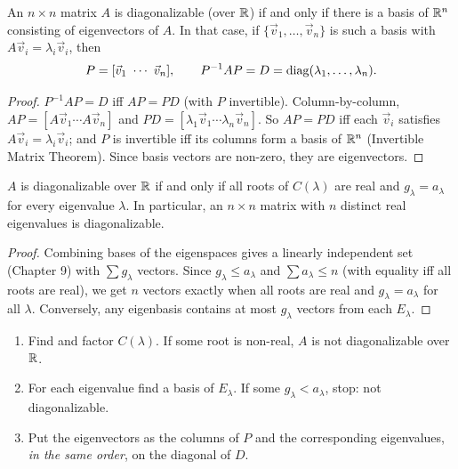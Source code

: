 \begin{theorem}
An $n\times n$ matrix $A$ is diagonalizable (over $\mathbb{R}$) if and only if there is a basis of $\mathbb{R}^n$ consisting
of eigenvectors of $A$. In that case, if $\{\vec v_1,\dots,\vec v_n\}$ is such a basis with
$A\vec v_i=\lambda_i\vec v_i$, then
\[
  P=[\vec v_1\ \cdots\ \vec v_n],\qquad P^{-1}AP=D=\operatorname{diag}(\lambda_1,\dots,\lambda_n).
\]
\end{theorem}
\begin{proof}
$P^{-1}AP=D$ iff $AP=PD$ (with $P$ invertible). Column-by-column, $AP=[A\vec v_1\cdots A\vec v_n]$ and
$PD=[\lambda_1\vec v_1\cdots\lambda_n\vec v_n]$. So $AP=PD$ iff each $\vec v_i$ satisfies
$A\vec v_i=\lambda_i\vec v_i$; and $P$ is invertible iff its columns form a basis of $\mathbb{R}^n$ (Invertible Matrix
Theorem). Since basis vectors are non-zero, they are eigenvectors.
\end{proof}

\begin{theorem}
$A$ is diagonalizable over $\mathbb{R}$ if and only if all roots of $C(\lambda)$ are real and $g_\lambda=a_\lambda$ for
every eigenvalue $\lambda$. In particular, an $n\times n$ matrix with $n$ distinct real eigenvalues is
diagonalizable.
\end{theorem}
\begin{proof}
Combining bases of the eigenspaces gives a linearly independent set (Chapter 9) with $\sum g_\lambda$ vectors.
Since $g_\lambda\le a_\lambda$ and $\sum a_\lambda\le n$ (with equality iff all roots are real), we get $n$ vectors
exactly when all roots are real and $g_\lambda=a_\lambda$ for all $\lambda$. Conversely, any eigenbasis contains at
most $g_\lambda$ vectors from each $E_\lambda$.
\end{proof}

\begin{important}[Algorithm]
\begin{enumerate}
  \item Find and factor $C(\lambda)$. If some root is non-real, $A$ is not diagonalizable over $\mathbb{R}$.
  \item For each eigenvalue find a basis of $E_\lambda$. If some $g_\lambda<a_\lambda$, stop: not diagonalizable.
  \item Put the eigenvectors as the columns of $P$ and the corresponding eigenvalues, \emph{in the same order},
        on the diagonal of $D$.
\end{enumerate}
\end{important}

